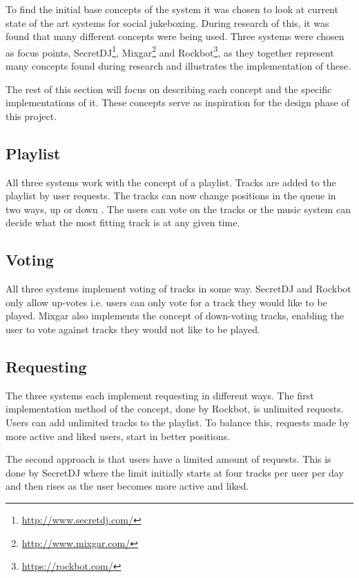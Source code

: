 To find the initial base concepts of the system it was chosen to look at current state of the art systems for social jukeboxing. During research of this, it was found that many different concepts were being used. Three systems were chosen as focus points, SecretDJ\footnote{\url{http://www.secretdj.com/}}, Mixgar\footnote{\url{http://www.mixgar.com/}} and Rockbot\footnote{\url{https://rockbot.com/}}, as they together represent many concepts found during research and illustrates the implementation of these.

The rest of this section will focus on describing each concept and the specific implementations of it. These concepts serve as inspiration for the design phase of this project.

\subsection{Playlist}
All three systems work with the concept of a playlist. Tracks are added to the playlist by user requests. The tracks can now change positions in the queue in two ways, up or down . The users can vote on the tracks or the music system can decide what the most fitting track is at any given time.

\subsection{Voting}
All three systems implement voting of tracks in some way. SecretDJ and Rockbot only allow up-votes i.e. users can only vote for a track they would like to be played. Mixgar also implements the concept of down-voting tracks, enabling the user to vote against tracks they would not like to be played.

\subsection{Requesting}
The three systems each implement requesting in different ways. The first implementation method of the concept, done by Rockbot, is unlimited requests. Users can add unlimited tracks to the playlist. To balance this, requests made by more active and liked
users, start in better positions.

The second approach is that users have a limited amount of requests. This is done by SecretDJ where the limit initially starts at four tracks per user per day and then rises as the user becomes more active and liked.

